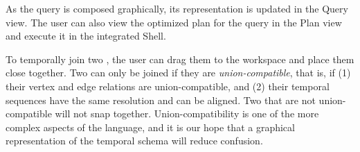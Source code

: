 As the query is composed graphically, its \ql representation is
updated in the Query view.  The user can also view the optimized plan
for the query in the Plan view and execute it in the integrated Shell.

To temporally join two \tgs, the user can drag them to the workspace
and place them close together.  Two \tgs can only be joined if they
are {\em union-compatible}, that is, if (1) their vertex and edge
relations are union-compatible, and (2) their temporal sequences have
the same resolution and can be aligned.  Two \tgs that are not
union-compatible will not snap together.  Union-compatibility is one
of the more complex aspects of the language, and it is our hope that a
graphical representation of the \tg temporal schema will reduce
confusion.


